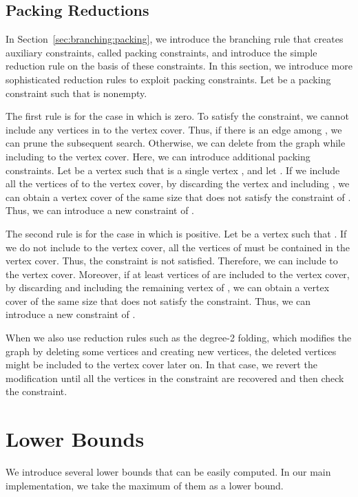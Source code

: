 \documentclass[11pt]{article}
\begin{document}
\subsection{Packing Reductions}\label{sec:reduction:packing}
In Section~\ref{sec:branching:packing}, we introduce the branching rule that creates auxiliary constraints, called
packing constraints, and introduce the simple reduction rule on the basis of these constraints.
In this section, we introduce more sophisticated reduction rules to exploit packing constraints.
Let  be a packing constraint such that  is nonempty.

The first rule is for the case in which  is zero.
To satisfy the constraint, we cannot include any vertices in  to the vertex cover.
Thus, if there is an edge among , we can prune the subsequent search.
Otherwise, we can delete  from the graph while including  to the vertex cover.
Here, we can introduce additional packing constraints.
Let  be a vertex such that  is a single vertex , and let .
If we include all the vertices of  to the vertex cover, by discarding the vertex  and including
, we can obtain a vertex cover of the same size that does not satisfy the constraint of .
Thus, we can introduce a new constraint of .

The second rule is for the case in which  is positive.
Let  be a vertex such that .
If we do not include  to the vertex cover, all the vertices of  must be contained in the vertex cover.
Thus, the constraint is not satisfied.
Therefore, we can include  to the vertex cover.
Moreover, if at least  vertices of  are included to the vertex cover, by discarding  and including
the remaining vertex of , we can obtain a vertex cover of the same size that does not satisfy the constraint.
Thus, we can introduce a new constraint of .

When we also use reduction rules such as the degree-2 folding, which modifies the graph by deleting some vertices
and creating new vertices, the deleted vertices might be included to the vertex cover later on.
In that case, we revert the modification until all the vertices in the constraint are recovered and then check the
constraint.
 \section{Lower Bounds}\label{sec:lower_bounds}

We introduce several lower bounds that can be easily computed.
In our main implementation, we take the maximum of them as a lower bound.
\end{document}
